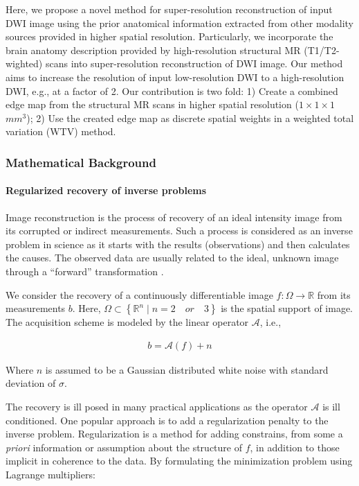 Here, we propose a novel method for super-resolution reconstruction of input DWI image using the prior anatomical information extracted from other modality sources provided in higher spatial resolution.
Particularly, we incorporate the brain anatomy description provided by high-resolution structural MR (T1/T2-wighted) scans into super-resolution reconstruction of DWI image.
Our method aims to increase the resolution of input low-resolution DWI to a high-resolution DWI, e.g., at a factor of 2. Our contribution is two fold: 1) Create a combined edge map from the structural MR scans in higher spatial resolution ($1 \times 1 \times 1$ $mm^3$); 2) Use the created edge map as discrete spatial weights in a weighted total variation (WTV) method.
\newline

\subsubsection{Mathematical Background} %

\paragraph{Regularized recovery of inverse problems} %

Image reconstruction is the process of recovery of an ideal intensity image from its corrupted or indirect measurements. Such a process is considered as an inverse problem in science as it starts with the results (observations) and then calculates the causes. The observed data are usually related to the ideal, unknown image through a ``forward'' transformation \cite{geman95}.

We consider the recovery of a continuously differentiable image $f:\Omega \rightarrow \mathbb{R}$ from its measurements $b$. Here, $\Omega \subset \left \{ \mathbb{R}^{n} \mid n = 2 \quad or \quad 3 \right \}$ is the spatial support of image. The acquisition scheme is modeled by the linear operator $\mathcal{A}$, i.e.,

\begin{equation}
\begin{gathered}
b = \mathcal{A}(f) + n
\end{gathered}
\end{equation}

Where $n$ is assumed to be a Gaussian distributed white noise with standard deviation of $\sigma$.

The recovery is ill posed in many practical applications as the operator $\mathcal{A}$ is ill conditioned. One popular approach is to add a regularization penalty to the inverse problem.
Regularization is a method for adding constrains, from some a \emph{priori} information or assumption about the structure of $f$, in addition to those implicit in coherence to the data.
By formulating the minimization problem using Lagrange multipliers:

